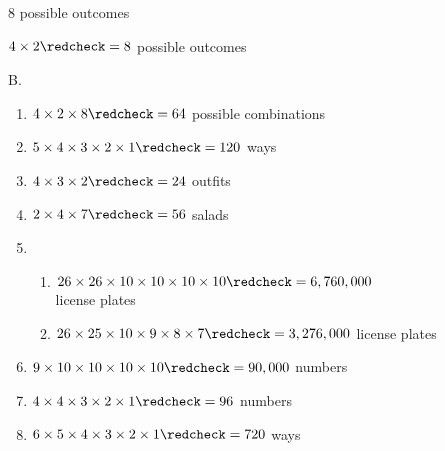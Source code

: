 8 \redcheck  
possible outcomes \redcheck 

$4 \times 2 \redcheck  = 
8$ \redcheck 
 possible outcomes \redcheck 
 
 B. 
 \begin{enumerate}[label = \arabic*. ]

\item %
$ 4\times 2\times  8\redcheck 
=64 $ \redcheck 
possible combinations \redcheck 

\item  %
$5 \times 4 \times 3 \times 2 \times 1 \redcheck 
=120 $ \redcheck 
ways \redcheck 

\item  %
$4 \times 3 \times 2 \redcheck 
=24 $ \redcheck 
outfits \redcheck 

\item  %
$2 \times 4 \times 7  \redcheck 
= 56 $ \redcheck 
salads \redcheck 

\item  %
\begin{enumerate}[label = \alph*. ]
\item %
$ 26 \times 26 \times 10 \times 10 \times 10 \times 10 \redcheck 
= 6,760,000$ \redcheck \\
license plates  \redcheck 

\item%
$ 26 \times 25 \times 10 \times 9 \times 8 \times 7   \redcheck 
= 3,276,000 $ \redcheck 
license plates  \redcheck 

\end{enumerate} 
 
\item %
$9 \times 10 \times 10 \times 10 \times 10 \redcheck 
= 90,000$ \redcheck 
numbers \redcheck 

\item %
$ 4\times 4 \times 3 \times 2 \times 1 \redcheck 
=96 $ \redcheck 
numbers \redcheck 

\item%
$6 \times 5 \times 4 \times 3 \times 2 \times 1 \redcheck 
=720 $ \redcheck 
ways \redcheck 

\end{enumerate} 
 
 